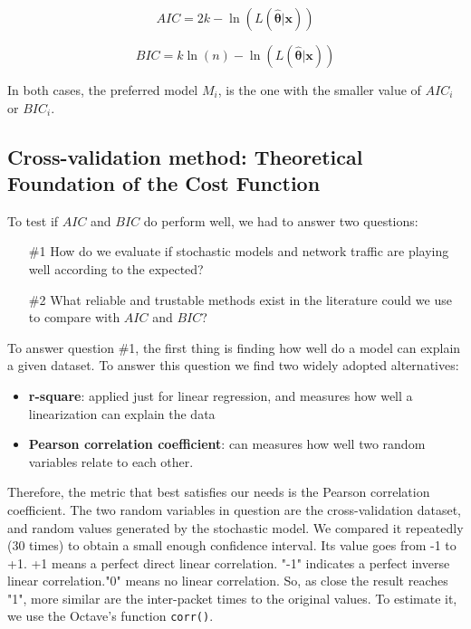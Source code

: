 \begin{equation}
\label{eq:aic}
AIC = 2k - \ln(L(\boldsymbol{\hat{\theta}}|\boldsymbol{x}))
\end{equation}

\begin{equation}
\label{eq:bic}
BIC = k\ln(n) - \ln(L(\boldsymbol{\hat{\theta}}|\boldsymbol{x}))
\end{equation}

In both cases, the preferred model $M_i$, is the one with the smaller value of $AIC_i$ or $BIC_i$.


\subsection{Cross-validation method: Theoretical Foundation of the Cost Function}

To test if $AIC$ and $BIC$ do perform well, we had to answer two questions:

\begin{itemize}
\item[\#1] How do we evaluate if stochastic models and network traffic are playing well according to the expected?
\item[\#2] What reliable and trustable methods exist in the literature could we use to compare with $AIC$ and $BIC$?
\end{itemize}

To answer question \#1, the first thing is finding how well do a model can explain a given dataset. To answer this question  we find two widely adopted alternatives:

\begin{itemize}
\item \textbf{r-square}: applied just for linear regression, and measures how well a linearization can explain the data
\item \textbf{Pearson correlation coefficient}: can measures how well two random variables relate to each other.
\end{itemize}

Therefore, the metric that best satisfies our needs is the Pearson correlation coefficient.  The two random variables in question are the cross-validation dataset, and random values generated by the stochastic model.  We compared it repeatedly (30 times) to obtain a small enough confidence interval.  Its value goes from -1 to +1. +1 means a perfect direct linear correlation. "-1" indicates a perfect inverse linear correlation."0" means no linear correlation. So, as close the result reaches "1", more similar are the inter-packet times to the original values. To estimate it, we use the Octave’s function \texttt{corr()}. 


